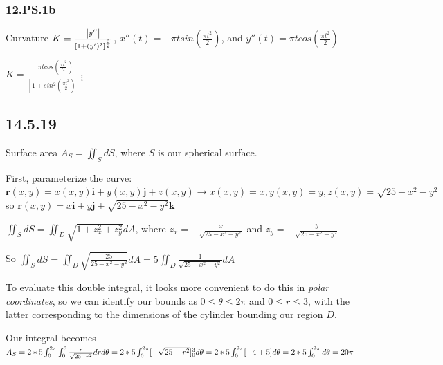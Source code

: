 \documentclass{article}
\begin{document}
\subsubsection{12.PS.1b}

\par\noindent\Large Curvature $K = \frac{\abs{y''}}{[1 + (y')^{2}]^{\frac{3}{2}}}$, $x''(t) = -\pi tsin(\frac{\pi t^{2}}{2})$, and $y''(t) = \pi tcos(\frac{\pi t^{2}}{2})$\vspace{0.25cm}

\par\noindent\Large $K = \frac{\pi tcos(\frac{\pi t^{2}}{2})}{[1 + sin^{2}(\frac{\pi t^{2}}{2})]^{\frac{3}{2}}}$

\subsection{14.5.19}
\par\noindent\Large Surface area $A_{S} = \iint_{S}dS$, where $S$ is our spherical surface.
\par\noindent\Large First, parameterize the curve: $\textbf{r}(x, y) = x(x, y)\textbf{i} + y(x, y)\textbf{j} + z(x, y) \rightarrow x(x, y) = x, y(x, y) = y, z(x, y) = \sqrt{25 - x^{2} - y^{2}}$ so $\textbf{r}(x, y) = x\textbf{i} + y\textbf{j} + \sqrt{25 - x^{2} - y^{2}}\textbf{k}$\vspace{0.25cm}

\par\noindent\Large $\iint_{S}dS = \iint_{D}\sqrt{1 + z_{x}^{2} + z_{y}^{2}}dA$, where $z_{x} = -\frac{x}{\sqrt{25 - x^{2} - y^{2}}}$ and $z_{y} = -\frac{y}{\sqrt{25 - x^{2} - y^{2}}}$
\par\noindent\Large So $\iint_{S}dS = \iint_{D}\sqrt{\frac{25}{25 - x^{2} - y^{2}}}dA = 5\iint_{D}\frac{1}{\sqrt{25 - x^{2} - y^{2}}}dA$\vspace{0.25cm}

\par\noindent\Large To evaluate this double integral, it looks more convenient to do this in \textit{polar coordinates}, so we can identify our bounds as $0 \leq \theta \leq 2\pi$ and $0 \leq r \leq 3$, with the latter corresponding to the dimensions of the cylinder bounding our region $D$.\vspace{0.25cm}

\par\noindent\Large Our integral becomes $A_{S} = 2 * 5\int_{0}^{2\pi}\int_{0}^{3}\frac{r}{\sqrt{25 - r^{2}}}drd\theta = 2 * 5\int_{0}^{2\pi}[-\sqrt{25 - r^{2}}]_{0}^{3}d\theta = \linebreak 2 * 5\int_{0}^{2\pi}[-4 + 5]d\theta = 2 * 5\int_{0}^{2\pi}d\theta = 20\pi$
\end{document}

